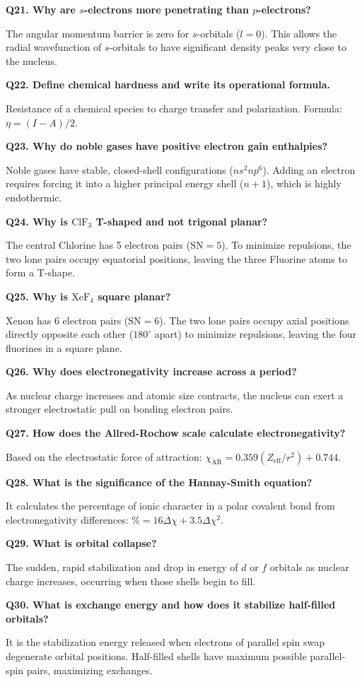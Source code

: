 \documentclass[12pt,a4paper]{article}
\newcommand{\Q}[1]{\textbf{#1}\par\noindent\ignorespaces}
\begin{document}
\begin{tcolorbox}[exambox, title={Frequently Asked / Viva Questions}]
  \Q{Q21. Why are $s$-electrons more penetrating than $p$-electrons?}
  The angular momentum barrier is zero for $s$-orbitals ($l=0$). This allows the radial wavefunction of $s$-orbitals to have significant density peaks very close to the nucleus.
  \par\vspace{6pt}
  \Q{Q22. Define chemical hardness and write its operational formula.}
  Resistance of a chemical species to charge transfer and polarization. Formula: $\eta = (I-A)/2$.
  \par\vspace{6pt}
  \Q{Q23. Why do noble gases have positive electron gain enthalpies?}
  Noble gases have stable, closed-shell configurations ($ns^2 np^6$). Adding an electron requires forcing it into a higher principal energy shell ($n+1$), which is highly endothermic.
  \par\vspace{6pt}
  \Q{Q24. Why is $\text{ClF}_3$ T-shaped and not trigonal planar?}
  The central Chlorine has 5 electron pairs ($\text{SN} = 5$). To minimize repulsions, the two lone pairs occupy equatorial positions, leaving the three Fluorine atoms to form a T-shape.
  \par\vspace{6pt}
  \Q{Q25. Why is $\text{XeF}_4$ square planar?}
  Xenon has 6 electron pairs ($\text{SN} = 6$). The two lone pairs occupy axial positions directly opposite each other ($180^\circ$ apart) to minimize repulsions, leaving the four fluorines in a square plane.
  \par\vspace{6pt}
  \Q{Q26. Why does electronegativity increase across a period?}
  As nuclear charge increases and atomic size contracts, the nucleus can exert a stronger electrostatic pull on bonding electron pairs.
  \par\vspace{6pt}
  \Q{Q27. How does the Allred-Rochow scale calculate electronegativity?}
  Based on the electrostatic force of attraction: $\chi_{\text{AR}} = 0.359 (Z_{\text{eff}}/r^2) + 0.744$.
  \par\vspace{6pt}
  \Q{Q28. What is the significance of the Hannay-Smith equation?}
  It calculates the percentage of ionic character in a polar covalent bond from electronegativity differences: $\% = 16\Delta\chi + 3.5\Delta\chi^2$.
  \par\vspace{6pt}
  \Q{Q29. What is orbital collapse?}
  The sudden, rapid stabilization and drop in energy of $d$ or $f$ orbitals as nuclear charge increases, occurring when those shells begin to fill.
  \par\vspace{6pt}
  \Q{Q30. What is exchange energy and how does it stabilize half-filled orbitals?}
  It is the stabilization energy released when electrons of parallel spin swap degenerate orbital positions. Half-filled shells have maximum possible parallel-spin pairs, maximizing exchanges.
\end{tcolorbox}
\end{document}
